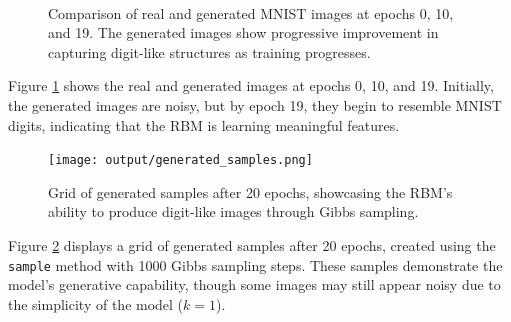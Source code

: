\documentclass{article}
\begin{document}
\begin{figure}[h]
    \\
    \hfill
    \caption{Comparison of real and generated MNIST images at epochs 0, 10, and 19. The generated images show progressive improvement in capturing digit-like structures as training progresses.}
    \label{fig:rbm_output}
\end{figure}

Figure \ref{fig:rbm_output} shows the real and generated images at epochs 0, 10, and 19. Initially, the generated images are noisy, but by epoch 19, they begin to resemble MNIST digits, indicating that the RBM is learning meaningful features.

\begin{figure}[h]
    \centering
    \texttt{[image: output/generated\_samples.png]}
    \caption{Grid of generated samples after 20 epochs, showcasing the RBM's ability to produce digit-like images through Gibbs sampling.}
    \label{fig:generated_samples}
\end{figure}

Figure \ref{fig:generated_samples} displays a grid of generated samples after 20 epochs, created using the \texttt{sample} method with 1000 Gibbs sampling steps. These samples demonstrate the model's generative capability, though some images may still appear noisy due to the simplicity of the model (\( k=1 \)).
\end{document}
